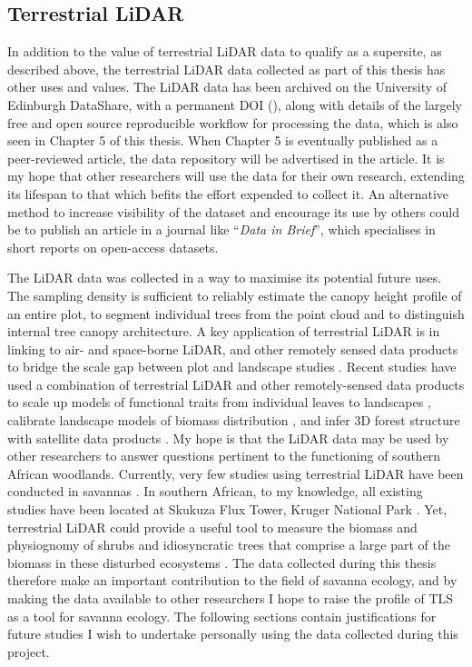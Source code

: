 \begin{refsection}
\section{Terrestrial LiDAR}
\label{legacy:sec:lidar}

In addition to the value of terrestrial LiDAR data to qualify as a supersite, as described above, the terrestrial LiDAR data collected as part of this thesis has other uses and values. The LiDAR data has been archived on the University of Edinburgh DataShare, with a permanent DOI (), along with details of the largely free and open source reproducible workflow for processing the data, which is also seen in Chapter 5 of this thesis. When Chapter 5 is eventually published as a peer-reviewed article, the data repository will be advertised in the article. It is my hope that other researchers will use the data for their own research, extending its lifespan to that which befits the effort expended to collect it. An alternative method to increase visibility of the dataset and encourage its use by others could be to publish an article in a journal like ``\textit{Data in Brief}'', which specialises in short reports on open-access datasets.

The LiDAR data was collected in a way to maximise its potential future uses. The sampling density is sufficient to reliably estimate the canopy height profile of an entire plot, to segment individual trees from the point cloud and to distinguish internal tree canopy architecture. A key application of terrestrial LiDAR is in linking to air- and space-borne LiDAR, and other remotely sensed data products to bridge the scale gap between plot and landscape studies \citep{Xiao2019}. Recent studies have used a combination of terrestrial LiDAR and other remotely-sensed data products to scale up models of functional traits from individual leaves to landscapes \citep{AbelleiraMartinez2016}, calibrate landscape models of biomass distribution \citep{RejouMechain2019}, and infer 3D forest structure with satellite data products \citep{Fischer2020}. My hope is that the LiDAR data may be used by other researchers to answer questions pertinent to the functioning of southern African woodlands. Currently, very few studies using terrestrial LiDAR have been conducted in savannas \citep{Muumbe2021}. In southern African, to my knowledge, all existing studies have been located at Skukuza Flux Tower, Kruger National Park \citep{Singh2018}. Yet, terrestrial LiDAR could provide a useful tool to measure the biomass and physiognomy of shrubs and idiosyncratic trees that comprise a large part of the biomass in these disturbed ecosystems \citep{Muir2018}. The data collected during this thesis therefore make an important contribution to the field of savanna ecology, and by making the data available to other researchers I hope to raise the profile of TLS as a tool for savanna ecology. The following sections contain justifications for future studies I wish to undertake personally using the data collected during this project.


\end{refsection}
